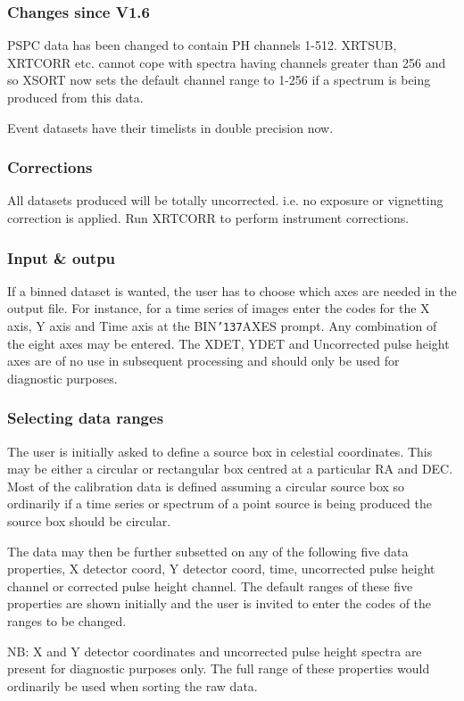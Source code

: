 \documentclass{book}
\renewcommand{\_}{{\tt\char'137}}     %
\begin{document}
\subsubsection{Changes since V1.6}
PSPC data has been changed to contain PH channels 1-512. XRTSUB, XRTCORR
etc. cannot cope with spectra having channels greater than 256 and so XSORT
now sets the default channel range to 1-256 if a spectrum is being produced
from this data.

Event datasets have their timelists in double precision now.

\subsubsection{Corrections}
All datasets produced will be totally uncorrected. i.e. no exposure
or vignetting correction is applied. Run XRTCORR to perform instrument
corrections.

\subsubsection{Input \& outpu}
If a binned dataset is wanted, the user has to choose which axes are
needed in the output file. For instance, for a time series of images
enter the codes for the X axis, Y axis and Time axis at the BIN\_AXES
prompt. Any combination of the eight axes may be entered. The XDET,
YDET and Uncorrected pulse height axes are of no use in subsequent
processing and should only be used for diagnostic purposes.

\subsubsection{Selecting data ranges}
The user is initially asked to define a source box in celestial
coordinates. This may be either a circular or rectangular box centred
at a particular RA and DEC. Most of the calibration data is defined
assuming a circular source box so ordinarily if a time series or
spectrum of a point source is being produced the source box
should be circular.

The data may then be further subsetted on any of the following five data
properties, X detector coord, Y detector coord, time, uncorrected
pulse height channel or corrected pulse height channel.
The default ranges of these five properties are shown initially
and the user is invited to enter the codes of the ranges to be changed.

NB: X and Y detector coordinates and uncorrected pulse height spectra
are present for diagnostic purposes only. The full range of these
properties would ordinarily be used when sorting the raw data.
\end{document}

